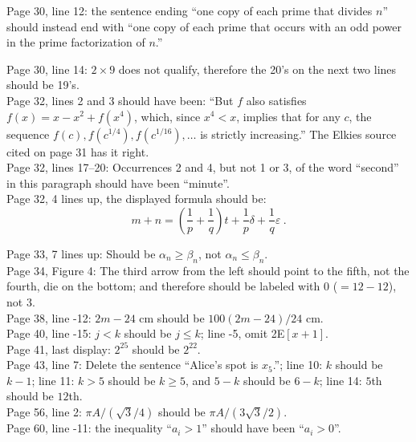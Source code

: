 \documentclass[11pt]{article}
\newcommand{\ep}{\varepsilon}
\begin{document}
Page 30, line 12: the sentence ending ``one copy of each prime that divides $n$'' should
instead end with ``one copy of each prime that occurs with an odd power in the
prime factorization of $n$.''

Page 30, line 14: $2\times9$ does not qualify, therefore the 20's on the next two lines should be 19's.\\

Page 32, lines 2 and 3 should have been: 
``But $f$ also satisfies $f(x) = x -x^2 + f(x^4)$, which, since $x^4 < x$, implies that for any $c$, the
sequence $f(c),f(c^{1/4}),f(c^{1/16}),\dots$ is strictly increasing.''  The Elkies source cited on page 31
has it right.\\

Page 32, lines 17--20:  Occurrences 2 and 4, but not 1 or 3, of the
word ``second'' in this paragraph should have been ``minute''.\\

Page 32, 4 lines up, the displayed formula should be:
$$
m + n = \left( \frac1p + \frac 1q \right)t + \frac1p \delta + \frac1q \ep~.
$$

Page 33, 7 lines up: Should be $\alpha_n \ge \beta_n$, not $\alpha_n \le \beta_n$.\\

Page 34, Figure 4: The third arrow from the left should point to the fifth, not the
fourth, die on the bottom; and therefore should be labeled with 0 ($= 12 - 12$), not 3.\\

Page 38, line -12: $2m-24$ cm should be $100(2m-24)/24$ cm.\\

Page 40, line -15: $j < k$ should be $j \le k$; line -5, omit 2E$[x+1]$.\\

Page 41, last display: $2^{25}$ should be $2^{22}$.\\

Page 43, line 7: Delete the sentence ``Alice's spot is $x_5$.'';
line 10: $k$ should be $k{-}1$;
line 11: $k>5$ should be $k\ge 5$, and $5{-}k$ should be $6{-}k$;
line 14: $5$th should be $12$th.\\

Page 56, line 2: $\pi A/(\sqrt{3}/4)$ should be $\pi A/(3\sqrt{3}/2)$.\\

Page 60, line -11: the inequality ``$a_i>1$'' should have been ``$a_i>0$''.\\
\end{document}
